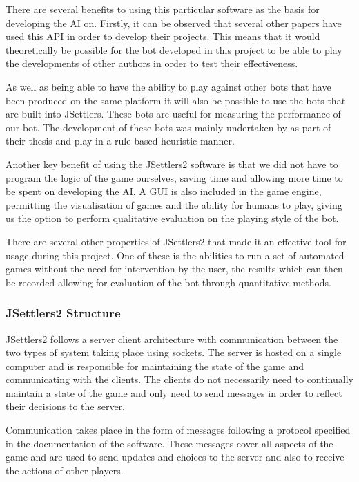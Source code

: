 \documentclass[]{article}
\begin{document}
\par There are several benefits to using this particular software as the basis for developing the AI on. Firstly, it can be observed that several other papers have used this API in order to develop their projects. This means that it would theoretically be possible for the bot developed in this project to be able to play the developments of other authors in order to test their effectiveness. 

\par As well as being able to have the ability to play against other bots that have been produced on the same platform it will also be possible to use the bots that are built into JSettlers. These bots are useful for measuring the performance of our bot. The development of these bots was mainly undertaken by \textcite{thomas2003real} as part of their thesis and play in a rule based heuristic manner.

\par Another key benefit of using the JSettlers2 software is that we did not have to program the logic of the game ourselves, saving time and allowing more time to be spent on developing the AI. A GUI is also included in the game engine, permitting the visualisation of games and the ability for humans to play, giving us the option to perform qualitative evaluation on the playing style of the bot.

\par There are several other properties of JSettlers2 that made it an effective tool for usage during this project. One of these is the abilities to run a set of automated games without the need for intervention by the user, the results which can then be recorded allowing for evaluation of the bot through quantitative methods. 

\subsubsection{JSettlers2 Structure}
JSettlers2 follows a server client architecture with communication between the two types of system taking place using sockets. The server is hosted on a single computer and is responsible for maintaining the state of the game and communicating with the clients. The clients do not necessarily need to continually maintain a state of the game and only need to send messages in order to reflect their decisions to the server.

\par Communication takes place in the form of messages following a protocol specified in the documentation of the software. These messages cover all aspects of the game and are used to send updates and choices to the server and also to receive the actions of other players.
\end{document}
